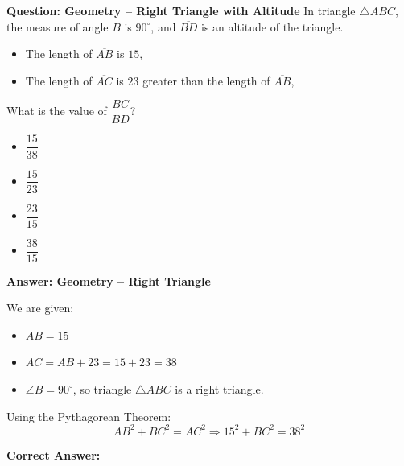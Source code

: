 \documentclass{beamer}
\begin{document}
\begin{frame}{\textbf{Question: Geometry – Right Triangle with Altitude}}
In triangle \( \triangle ABC \), the measure of angle \( B \) is \( 90^\circ \), and \( \overline{BD} \) is an altitude of the triangle.

\begin{itemize}
    \item The length of \( \overline{AB} \) is \( 15 \),
    \item The length of \( \overline{AC} \) is \( 23 \) greater than the length of \( \overline{AB} \),
\end{itemize}

What is the value of \( \dfrac{BC}{BD} \)?
\begin{itemize}
    \item[A.] \( \dfrac{15}{38} \)
    \item[B.] \( \dfrac{15}{23} \)
    \item[C.] \( \dfrac{23}{15} \)
    \item[D.] \( \dfrac{38}{15} \)
\end{itemize}

\end{frame}
\begin{frame}{\textbf{Answer: Geometry – Right Triangle }}

We are given:
\begin{itemize}
    \item \( AB = 15 \)
    \item \( AC = AB + 23 = 15 + 23 = 38 \)
    \item \( \angle B = 90^\circ \), so triangle \( \triangle ABC \) is a right triangle.
\end{itemize}

Using the Pythagorean Theorem:
\[
AB^2 + BC^2 = AC^2 \Rightarrow 15^2 + BC^2 = 38^2
\]


\textbf{Correct Answer:} 
\end{frame}
\end{document}
